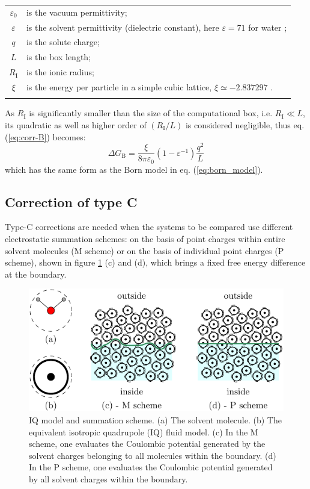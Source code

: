 \begin{tabular}{cl}
 $\varepsilon_{0}$ & is the vacuum permittivity;\tabularnewline
$\varepsilon$ & is the solvent permittivity (dielectric constant), here $\varepsilon=71$
for water \citep{Kusalik_1994_dc_spc/e,SPC/E};\tabularnewline
$q$ & is the solute charge;\tabularnewline
$L$ & is the box length;\tabularnewline
$R_{\mathrm{I}}$ & is the ionic radius;\tabularnewline
$\xi$ & is the energy per particle in a simple cubic lattice, $\xi\simeq-2.837297$
\citep{nijboer}.\tabularnewline
 & \tabularnewline
\end{tabular} 

As $R_{\mathrm{I}}$ is significantly smaller than the size of the
computational box, i.e. $R_{\mathrm{I}}\ll L$, its quadratic as well
as higher order of $\left(R_{\mathrm{I}}/L\right)$ is considered
negligible, thus eq. (\ref{eq:corr-B}) becomes:
\begin{equation}
\Delta G_{\mathrm{B}}=\frac{\xi}{8\pi\varepsilon_{0}}\left(1-\varepsilon^{-1}\right)\frac{q^{2}}{L}
\end{equation}
which has the same form as the Born model in eq. (\ref{eq:born_model}).

\subsection{Correction of type C}

Type-C corrections are needed when the systems to be compared use
different electrostatic summation schemes: on the basis of point charges
within entire solvent molecules (M scheme) or on the basis of individual
point charges (P scheme), shown in figure \ref{fig:IQ-model-som-scheme}
(c) and (d), which brings a fixed free energy difference at the boundary.

\begin{figure}[h]
\begin{centering}
\includegraphics{_figure/ion_correction}
\par\end{centering}
\caption[IQ model and summation scheme]{IQ model and summation scheme. (a) The solvent molecule. (b) The
equivalent isotropic quadrupole (IQ) fluid model. (c) In the M scheme,
one evaluates the Coulombic potential generated by the solvent charges
belonging to all molecules within the boundary. (d) In the P scheme,
one evaluates the Coulombic potential generated by all solvent charges
within the boundary.\label{fig:IQ-model-som-scheme}}
\end{figure}

